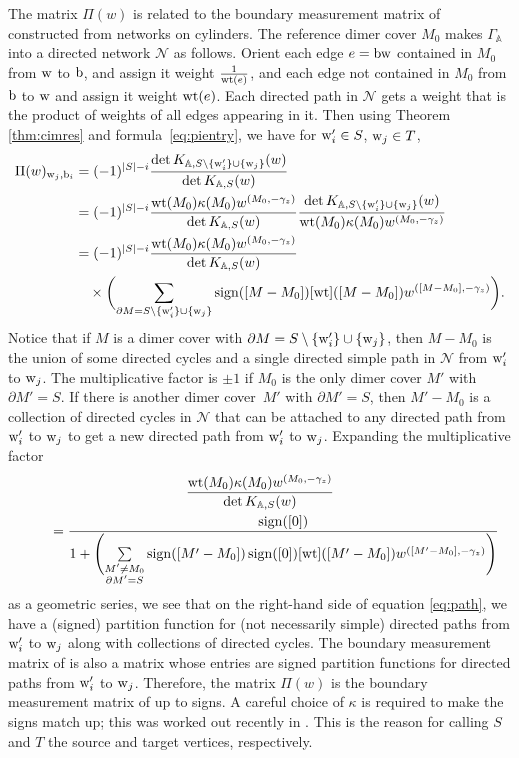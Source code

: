 \documentclass[pdftex]{sigma}
\numberwithin{equation}{section}
\newcommand{\A}{{\mathbb A}}
\newcommand{\la}{\label}
\newcommand{\w}{{\rm w}}
\newcommand{\bw}{{\rm b}}
\newcommand{\wt}{{\rm wt}}
\begin{document}
	\begin{Remark}
		\label{rem:bmm}
		The matrix $\Pi(w)$ is related to the boundary measurement matrix of \cite{GSTV} constructed from networks on cylinders.
		The reference dimer cover $M_0$ makes $\Gamma_\A$ into a directed network $\mathcal N$ as follows. Orient each edge $e=\bw \w$ contained in $M_0$ from $\w$ to $\bw$, and assign it weight $\frac 1 {\wt(e)}$, and each edge not contained in $M_0$ from $\bw$ to $\w$ and assign it weight $\wt(e)$. Each directed path in $\mathcal N$ gets a weight that is the product of weights of all edges appearing in it. Then using Theorem \ref{thm:cimres} and formula~\eqref{eq:pientry}, we have for $\w'_i \in S$, $\w_j \in T$,
		\begin{align}
			\Pi(w)_{\w_j,\bw_i}&=(-1)^{|S|-i} \frac{ \det K_{\A,S \setminus \{ \w'_i \} \cup \{ \w_j \}}(w)}{ \det K_{\A,S}(w)}\nonumber\\
			&{}=(-1)^{|S|-i} \frac{\wt(M_0) \kappa(M_0) w^{(M_0,-\gamma_z)}}{ \det K_{\A,S}(w)} \frac{ \det K_{\A,S \setminus \{ \w'_i \} \cup \{ \w_j \}}(w)}{\wt(M_0) \kappa(M_0) w^{(M_0,-\gamma_z)}}\nonumber\\
			&{}=(-1)^{|S|-i} \frac{\wt(M_0) \kappa(M_0) w^{(M_0,-\gamma_z)}}{ \det K_{\A,S}(w)} \nonumber \\
			&\quad{} \times\biggl( \sum_{\partial M=S \setminus \{ \w'_i \}\cup \{\w_j\}} \operatorname{sign}([M-M_0]) [\wt]([M-M_0])w^{([M-M_0],-\gamma_z)}\biggr). \la{eq:path}
		\end{align}
		Notice that if $M$ is a dimer cover with $\partial M =S \setminus \{ \w'_i \}\cup \{\w_j\}$, then $M-M_0$ is the union of some directed cycles and a single directed simple path in $\mathcal N$ from $\w'_i$ to $\w_j$. The multiplicative factor is $\pm1$ if $M_0$ is the only dimer cover $M'$ with $\partial M'=S$. If there is another dimer cover~$M'$ with $\partial M'=S$, then $M'-M_0$ is a collection of directed cycles in $\mathcal N$ that can be attached to any directed path from $\w'_i$ to $\w_j$ to get a new directed path from $\w'_i$ to $\w_j$. Expanding the multiplicative factor
		\begin{gather*}
		\frac{\wt(M_0) \kappa(M_0) w^{(M_0,-\gamma_z)}}{ \det K_{\A,S}(w)}\\
\qquad{}=\frac{ \operatorname{sign}([0])}{ 1+\Biggl(\sum\limits_{\substack{M' \neq M_0 \\ \partial M'=S}} \operatorname{sign}([M'-M_0]) \operatorname{sign}([0]) [\wt]([M'-M_0])w^{([M'-M_0],-\gamma_z)}\Biggr)}
		\end{gather*}
		as a geometric series, we see that on the right-hand side of equation \eqref{eq:path}, we have a (signed) partition function for (not necessarily simple) directed paths from $\w'_i$ to $\w_j$ along with collections of directed cycles. The boundary measurement matrix of \cite{GSTV} is also a matrix whose entries are signed partition functions for directed paths from $\w'_i$ to $\w_j$. Therefore, the matrix $\Pi(w)$ is the boundary measurement matrix of \cite{GSTV} up to signs. A careful choice of $\kappa$ is required to make the signs match up; this was worked out recently in \cite{Izosimov1}. This is the reason for calling $S$ and $T$ the source and target vertices, respectively.
	\end{Remark}
	
\end{document}
